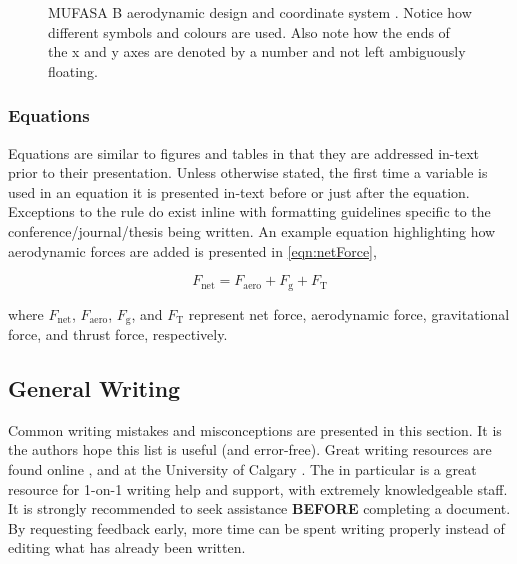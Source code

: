 \begin{figure}[hbt!]
	\centering
	\captionsetup{width=0.5\textwidth}
	\def\svgwidth{0.55\textwidth}
	
	\caption{MUFASA B aerodynamic design and coordinate system \cite{BenThesis}. Notice how different symbols and colours are used. Also note how the ends of the x and y axes are denoted by a number and not left ambiguously floating.}
	\label{fig:dataExample}
	\hfill
\end{figure}

\subsubsection{Equations}

Equations are similar to figures and tables in that they are addressed in-text prior to their presentation. 
Unless otherwise stated, the first time a variable is used in an equation it is presented in-text before or just after the equation. 
Exceptions to the rule do exist inline with formatting guidelines specific to the conference/journal/thesis being written. 
An example equation highlighting how aerodynamic forces are added is presented in \cref{eqn:netForce}, 

\begin{equation} \label{eqn:netForce}
	F_{\text{net}} = F_{\text{aero}} + F_{\text{g}} + F_{\text{T}}
\end{equation}

\noindent where $F_{\text{net}}$, $F_{\text{aero}}$, $F_{\text{g}}$, and $F_{\text{T}}$ represent net force, aerodynamic force, gravitational force, and thrust force, respectively. 

\subsection{General Writing}

Common writing mistakes and misconceptions are presented in this section. It is the authors hope this list is useful (and error-free). 
Great writing resources are found online \cite{writingAIAA}, and at the University of Calgary \cite{writingUofC,writingCoursesUofC}. 
The \citeauthor{writingUofC} \cite{writingUofC} in particular is a great resource for 1-on-1 writing help and support, with extremely knowledgeable staff. 
It is strongly recommended to seek assistance \textbf{BEFORE} completing a document. By requesting feedback early, more time can be spent writing properly instead of editing what has already been written. 

